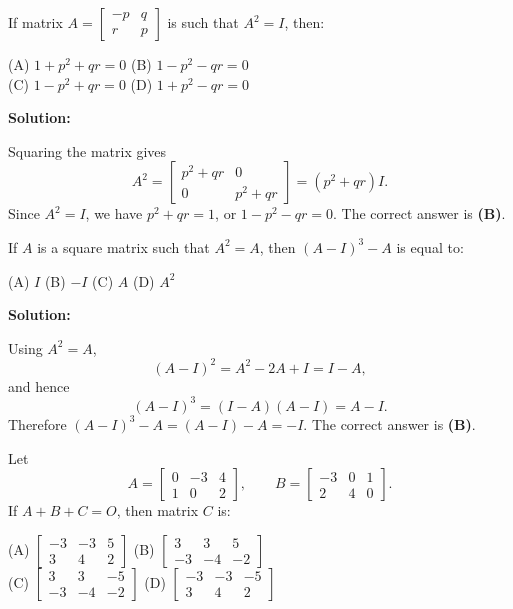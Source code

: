 \documentclass[journal]{IEEEtran}
\begin{document}
\begin{list}{}{\setlength{\leftmargin}{1.15cm}\setlength{\labelwidth}{1.0cm}\setlength{\labelsep}{0.15cm}\setlength{\itemindent}{0pt}\setlength{\listparindent}{0pt}\setlength{\itemsep}{\baselineskip}\setlength{\parsep}{0pt}\setlength{\topsep}{0pt}}
\item[5.1.1] If matrix $A=\begin{bmatrix}-p&q\\r&p\end{bmatrix}$ is such that $A^2=I$, then:

\noindent (A) $1+p^2+qr=0$ \hfill (B) $1-p^2-qr=0$ \\
(C) $1-p^2+qr=0$ \hfill (D) $1+p^2-qr=0$

\vspace{0.6em}\par\noindent\textbf{Solution:}

Squaring the matrix gives
\[
A^2=\begin{bmatrix}p^2+qr&0\\0&p^2+qr\end{bmatrix}=(p^2+qr)I.
\]
Since $A^2=I$, we have $p^2+qr=1$, or $1-p^2-qr=0$. The correct answer is \textbf{(B)}.

\item[5.1.2] If $A$ is a square matrix such that $A^2=A$, then $(A-I)^3-A$ is equal to:

\noindent (A) $I$ \hfill (B) $-I$ \hfill (C) $A$ \hfill (D) $A^2$

\vspace{0.6em}\par\noindent\textbf{Solution:}

Using $A^2=A$,
\[
(A-I)^2=A^2-2A+I=I-A,
\]
and hence
\[
(A-I)^3=(I-A)(A-I)=A-I.
\]
Therefore $(A-I)^3-A=(A-I)-A=-I$. The correct answer is \textbf{(B)}.

\item[5.1.4] Let
\[
A=\begin{bmatrix}0&-3&4\\1&0&2\end{bmatrix},\qquad
B=\begin{bmatrix}-3&0&1\\2&4&0\end{bmatrix}.
\]
If $A+B+C=O$, then matrix $C$ is:

\noindent (A) $\begin{bmatrix}-3&-3&5\\3&4&2\end{bmatrix}$ \hfill
(B) $\begin{bmatrix}3&3&5\\-3&-4&-2\end{bmatrix}$ \\
(C) $\begin{bmatrix}3&3&-5\\-3&-4&-2\end{bmatrix}$ \hfill
(D) $\begin{bmatrix}-3&-3&-5\\3&4&2\end{bmatrix}$


\end{list}
\end{document}
